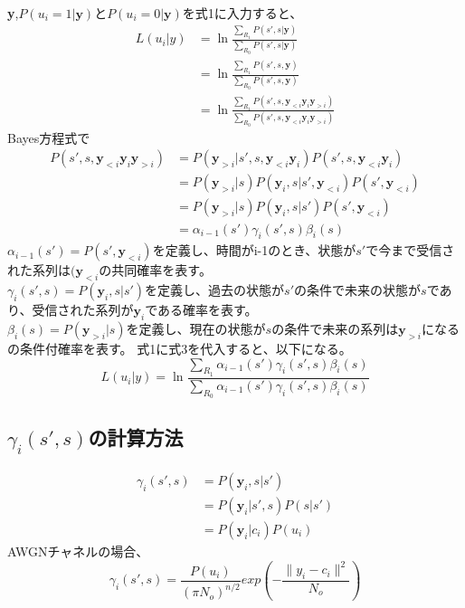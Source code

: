 \documentclass[20 pts]{article}
\begin{document}
\paragraph{}
\textbf{y},$P(u_i=1|\boldsymbol{y})$と$P(u_i=0|\boldsymbol{y})$を式1に入力すると、
\begin{equation}
\begin{split}
L(u_i|y)&=\ln\frac{\sum_{R_1}^{}P(s',s|\boldsymbol{y})}{\sum_{R_0}^{}P(s',s|\boldsymbol{y})}\\
&=\ln\frac{\sum_{R_1}^{}P(s',s,\boldsymbol{y})}{\sum_{R_0}^{}P(s',s,\boldsymbol{y})}\\
&=\ln\frac{\sum_{R_1}^{}P(s',s,\boldsymbol{y}_{<i} \boldsymbol{y}_i \boldsymbol{y}_{>i})}{\sum_{R_0}^{}P(s',s,\boldsymbol{y}_{<i} \boldsymbol{y}_i \boldsymbol{y}_{>i})}
\end{split}
\end{equation}
Bayes方程式で
\begin{equation}
\begin{split}
P(s',s,\boldsymbol{y}_{<i} \boldsymbol{y}_i \boldsymbol{y}_{>i})&=P(\boldsymbol{y}_{>i}|s',s,\boldsymbol{y}_{<i}\boldsymbol{y}_{i})P(s',s,\boldsymbol{y}_{<i}\boldsymbol{y}_{i})\\
&=P(\boldsymbol{y}_{>i}|s)P(\boldsymbol{y}_{i},s|s',\boldsymbol{y}_{<i})P(s',\boldsymbol{y}_{<i})\\
&=P(\boldsymbol{y}_{>i}|s)P(\boldsymbol{y}_{i},s|s')P(s',\boldsymbol{y}_{<i})\\
&=\alpha_{i-1}(s')\gamma_i(s',s)\beta_i(s)
\end{split}
\end{equation}
$\alpha_{i-1}(s')=P(s',\boldsymbol{y}_{<i})$を定義し、時間がi-1のとき、状態が$s'$で今まで受信された系列は$(\boldsymbol{y}_{<i}$の共同確率を表す。\\
$\gamma_i(s',s)=P(\boldsymbol{y}_{i},s|s')$を定義し、過去の状態が$s'$の条件で未来の状態が$s$であり、受信された系列が$\boldsymbol{y}_{i}$である確率を表す。\\
$\beta_i(s)=P(\boldsymbol{y}_{>i}|s)$を定義し、現在の状態が$s$の条件で未来の系列は$\boldsymbol{y}_{>i}$になるの条件付確率を表す。
式1に式3を代入すると、以下になる。
\begin{equation}L(u_i|y)=\ln\frac{\sum_{R_1}^{}\alpha_{i-1}(s')\gamma_i(s',s)\beta_i(s)}{\sum_{R_0}^{}\alpha_{i-1}(s')\gamma_i(s',s)\beta_i(s)}\end{equation}
\subsection{$\gamma_i(s',s)$の計算方法}
\begin{equation}
\begin{split}
\gamma_i(s',s)&=P(\boldsymbol{y}_{i},s|s')\\
&=P(\boldsymbol{y}_{i}|s',s)P(s|s')\\
&=P(\boldsymbol{y}_{i}|c_i)P(u_i)
\end{split}
\end{equation}
AWGNチャネルの場合、
\begin{equation}
\gamma_i(s',s)=\frac{P(u_i)}{(\pi N_o)^{n/2}}exp(-\frac{\|{y_i-c_i}\|^2}{N_o})
\end{equation}
\end{document}

